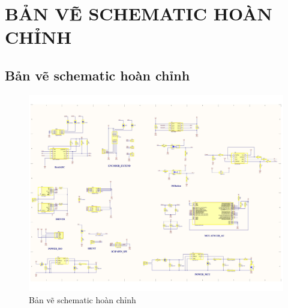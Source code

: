 \chapter{BẢN VẼ SCHEMATIC HOÀN CHỈNH}
\section{Bản vẽ schematic hoàn chỉnh}
\begin{figure}[H]
    \centering
    \includegraphics[width=1\textwidth]{pictures/ISO_current.png}
    \caption{Bản vẽ schematic hoàn chỉnh}
\end{figure}
\cleardoublepage